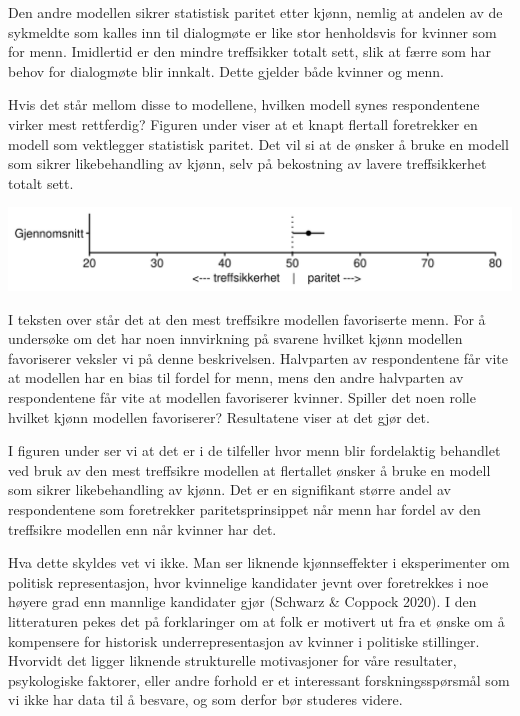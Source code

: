 \documentclass[
]{book}
\begin{document}
Den andre modellen sikrer statistisk paritet etter kjønn, nemlig at andelen av de sykmeldte som kalles inn til dialogmøte er like stor henholdsvis for kvinner som for menn.
Imidlertid er den mindre treffsikker totalt sett, slik at færre som har behov for dialogmøte blir innkalt.
Dette gjelder både kvinner og menn.

Hvis det står mellom disse to modellene, hvilken modell synes respondentene virker mest rettferdig?
Figuren under viser at et knapt flertall foretrekker en modell som vektlegger statistisk paritet.
Det vil si at de ønsker å bruke en modell som sikrer likebehandling av kjønn, selv på bekostning av lavere treffsikkerhet totalt sett.

\includegraphics{figs/png/fig_parity_avg.png}

I teksten over står det at den mest treffsikre modellen favoriserte menn.
For å undersøke om det har noen innvirkning på svarene hvilket kjønn modellen favoriserer veksler vi på denne beskrivelsen.
Halvparten av respondentene får vite at modellen har en bias til fordel for menn, mens den andre halvparten av respondentene får vite at modellen favoriserer kvinner.
Spiller det noen rolle hvilket kjønn modellen favoriserer?
Resultatene viser at det gjør det.

I figuren under ser vi at det er i de tilfeller hvor menn blir fordelaktig behandlet ved bruk av den mest treffsikre modellen at flertallet ønsker å bruke en modell som sikrer likebehandling av kjønn.
Det er en signifikant større andel av respondentene som foretrekker paritetsprinsippet når menn har fordel av den treffsikre modellen enn når kvinner har det.

Hva dette skyldes vet vi ikke.
Man ser liknende kjønnseffekter i eksperimenter om politisk representasjon, hvor kvinnelige kandidater jevnt over foretrekkes i noe høyere grad enn mannlige kandidater gjør (Schwarz \& Coppock 2020).
I den litteraturen pekes det på forklaringer om at folk er motivert ut fra et ønske om å kompensere for historisk underrepresentasjon av kvinner i politiske stillinger.
Hvorvidt det ligger liknende strukturelle motivasjoner for våre resultater, psykologiske faktorer, eller andre forhold er et interessant forskningsspørsmål som vi ikke har data til å besvare, og som derfor bør studeres videre.
\end{document}
